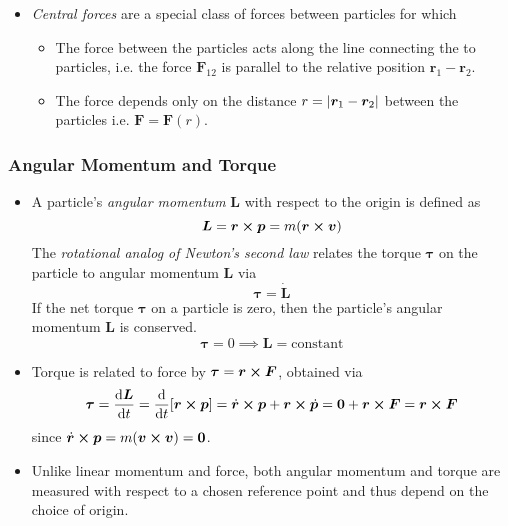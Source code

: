 \documentclass[11pt, a4paper]{article}
\newcommand{\bdot}[1]{\dot{\bm{#1}}}
\begin{document}
\begin{itemize}
	\item \textit{Central forces} are a special class of forces between particles for which
	\begin{itemize}
		\item The force between the particles acts along the line connecting the to particles, i.e. the force $ \bm{F}_{12} $ is parallel to the relative position $ \bm{r}_{1} - \bm{r}_{2} $.
		
		\item The force depends only on the distance $ r = \abs{\bm{r}_{1} - \bm{r}_{2}} $ between the particles i.e. $ \bm{F} = \bm{F}(r) $.
		
	\end{itemize}
\end{itemize}


\subsubsection{Angular Momentum and Torque}
\begin{itemize}
	\item A particle's \textit{angular momentum} $ \bm{L} $ with respect to the origin is defined as
	\begin{equation*}
		\bm{L} = \bm{r} \cross \bm{p} = m (\bm{r} \cross \bm{v})
	\end{equation*}
	The \textit{rotational analog of Newton's second law} relates the torque $ \bm{\tau} $ on the particle to angular momentum $ \bm{L} $ via
	\begin{equation*}
		\bm{\tau} = \bdot{L}
	\end{equation*}
	If the net torque $ \bm{\tau} $ on a particle is zero, then the particle's angular momentum $ \bm{L} $ is conserved. 
	\begin{equation*}
		 \bm{\tau} = 0 \implies \bm{L} = \text{constant} 
	\end{equation*}
	
	\item Torque is related to force by $ \bm{\tau} = \bm{r} \cross \bm{F} $, obtained via
	\begin{align*}
		\bm{\tau} = \dv{\bm{L}}{t} = \dv{}{t}[\bm{r} \cross \bm{p}] = \dot{\bm{r}} \cross \bm{p} + \bm{r} \cross \dot{\bm{p}} = \bm{0} + \bm{r} \cross \bm{F} =  \bm{r} \cross \bm{F}
	\end{align*}
	since $ \dot{\bm{r}} \cross \bm{p} = m (\bm{v} \cross \bm{v}) = \bm{0} $.
	
	\item Unlike linear momentum and force, both angular momentum and torque are measured with respect to a chosen reference point and thus depend on the choice of origin.
	
\end{itemize}
\end{document}

